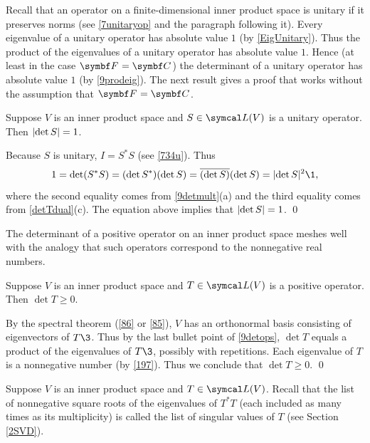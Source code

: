 Recall that an operator on a finite-dimensional inner product space is unitary if it preserves norms (see \ref{7unitaryop} and the paragraph following it). Every eigenvalue of a unitary operator has absolute value $1$ (by \ref{EigUnitary}). Thus the product of the eigenvalues of a unitary operator has absolute value $1$. Hence (at least in the case $\F{} = \C{}$) the determinant of a unitary operator has absolute value $1$ (by \ref{9prodeig}). The next result gives a proof that works without the assumption that $\F{} = \C{}$.

{Suppose\/ $V$ is an inner product space and $S \in \L(V)$ is a unitary operator. Then
$\lvert\det S\rvert = 1$.}

\proof
Because $S$ is unitary, $I = S^* S$ (see \ref{734u}). Thus
\[
1 = \det(S^* S) = (\det S^*) (\det S) = \overline{( \det S)} (\det S) = \abs{\det S}^2\1,
\]
where the second equality comes from \ref{9detmult}(a) and the third equality comes from \ref{detTdual}(c). The equation above implies that $\lvert\det S\rvert = 1$.
\qed

The determinant of a positive operator on an inner product space meshes well with the analogy that such operators correspond to the nonnegative real numbers.

{Suppose $V$ is an inner product space and $T \in \L(V)$ is a positive operator.
Then $\det T \ge 0$.}

\proof
By the spectral theorem (\ref{86} or \ref{85}), $V$ has an orthonormal basis consisting of eigenvectors of $T\3$. Thus by the last bullet point of \ref{9detops}, $\det T$ equals a product of the eigenvalues of $T\3$, possibly with repetitions. Each eigenvalue of $T$ is a nonnegative number (by \ref{197}). Thus we conclude that $\det T \ge 0$.
\qed

Suppose $V$ is an inner product space and $T \in \L(V)$. Recall that the list of nonnegative square roots of the eigenvalues of $T^* T$ (each included as many times as its multiplicity) is called the list of singular values of $T$ (see Section \ref{2SVD}).


